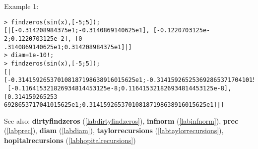 \noindent Example 1: 
\begin{center}\begin{minipage}{15cm}\begin{Verbatim}[frame=single]
> findzeros(sin(x),[-5;5]);
[|[-0.314208984375e1;-0.3140869140625e1], [-0.1220703125e-2;0.1220703125e-2], [0
.3140869140625e1;0.314208984375e1]|]
> diam=1e-10!;
> findzeros(sin(x),[-5;5]);
[|[-0.314159265370108187198638916015625e1;-0.3141592652536928653717041015625e1],
 [-0.116415321826934814453125e-8;0.116415321826934814453125e-8], [0.314159265253
6928653717041015625e1;0.314159265370108187198638916015625e1]|]
\end{Verbatim}
\end{minipage}\end{center}
See also: \textbf{dirtyfindzeros} (\ref{labdirtyfindzeros}), \textbf{infnorm} (\ref{labinfnorm}), \textbf{prec} (\ref{labprec}), \textbf{diam} (\ref{labdiam}), \textbf{taylorrecursions} (\ref{labtaylorrecursions}), \textbf{hopitalrecursions} (\ref{labhopitalrecursions})
